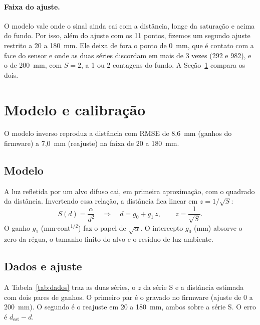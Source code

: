 \documentclass[11pt,a4paper]{article}
\begin{document}
\paragraph{Faixa do ajuste.} O modelo vale onde o sinal ainda cai com a distância, longe da saturação e acima do fundo. Por isso, além do ajuste com os 11 pontos, fizemos um segundo ajuste restrito a 20 a 180~mm. Ele deixa de fora o ponto de 0~mm, que é contato com a face do sensor e onde as duas séries discordam em mais de 3 vezes (292 e 982), e o de 200~mm, com $S = 2$, a 1 ou 2 contagens do fundo. A Seção~\ref{sec:modelo} compara os dois.

\section{Modelo e calibração}
\label{sec:modelo}

O modelo inverso reproduz a distância com RMSE de 8,6~mm (ganhos do firmware) a 7,0~mm (reajuste) na faixa de 20 a 180~mm.

\subsection{Modelo}

A luz refletida por um alvo difuso cai, em primeira aproximação, com o quadrado da distância. Invertendo essa relação, a distância fica linear em $z = 1/\sqrt{S}$:
\begin{equation}
  S(d) = \frac{\alpha}{d^2}
  \quad\Longrightarrow\quad
  d = g_0 + g_1\, z, \qquad z = \frac{1}{\sqrt{S}}.
  \label{eq:modelo}
\end{equation}
O ganho $g_1$ (mm$\cdot$cont$^{1/2}$) faz o papel de $\sqrt{\alpha}$. O intercepto $g_0$ (mm) absorve o zero da régua, o tamanho finito do alvo e o resíduo de luz ambiente.

\subsection{Dados e ajuste}

A Tabela~\ref{tab:dados} traz as duas séries, o $z$ da série S e a distância estimada com dois pares de ganhos. O primeiro par é o gravado no firmware (ajuste de 0 a 200~mm). O segundo é o reajuste em 20 a 180~mm, ambos sobre a série S. O erro é $d_{\mathrm{est}} - d$.
\end{document}
